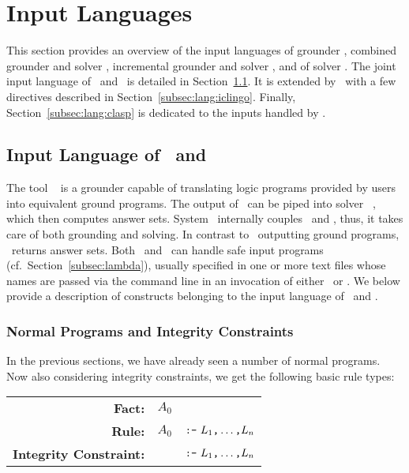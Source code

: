 \section{Input Languages}\label{sec:language}

This section provides an overview of the input languages of
grounder \gringo, combined grounder and solver \clingo,
incremental grounder and solver \iclingo, and of solver \clasp.
The joint input language of \gringo\ and \clingo\ is detailed in
Section~\ref{subsec:lang:gringo}.
It is extended by \iclingo\ with a few directives described in Section~\ref{subsec:lang:iclingo}.
Finally, Section~\ref{subsec:lang:clasp} is dedicated to the inputs
handled by \clasp.


\subsection{Input Language of \gringo\ and \clingo}\label{subsec:lang:gringo}

The tool \gringo~\cite{gescth07a} is a grounder capable of translating
logic programs provided by users into equivalent ground programs.
The output of \gringo\ can be piped into solver \clasp~\cite{gekanesc07b},
which then computes answer sets.
System \clingo\ internally couples \gringo\ and \clasp, thus,
it takes care of both grounding and solving.
In contrast to \gringo\ outputting ground programs, 
\clingo\ returns answer sets.
Both \gringo\ and \clingo\ can handle safe input programs
(cf.\ Section~\ref{subsec:lambda}),
usually specified in one or more text files whose names are passed via the command line
in an invocation of either \gringo\ or \clingo.
We below provide a description of constructs belonging to the input language of \gringo\ and \clingo.


\subsubsection{Normal Programs and Integrity Constraints}\label{subsec:gringo:normal}

In the previous sections, we have already seen a number of normal programs.
Now also considering integrity constraints, we get the following basic rule types:

\begin{tabular}{rl@{}l}
\textbf{Fact:} & $A_0$&\code{.}
\\
\textbf{Rule:} & $A_0$& $\texttt{:-}~L_1\texttt{,}\dots\texttt{,}L_n$\code{.}
\\
\textbf{Integrity Constraint:} & & $\texttt{:-}~L_1\texttt{,}\dots\texttt{,}L_n$\code{.}
\end{tabular}
\\

